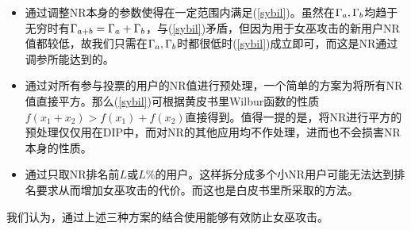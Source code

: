 \begin{itemize}
	\item 通过调整NR本身的参数使得在一定范围内满足(\ref{sybil})。虽然在$\Gamma_a,\Gamma_b$均趋于无穷时有$\Gamma_{a+b}=\Gamma_a+\Gamma_b$，与(\ref{sybil})矛盾，但因为用于女巫攻击的新用户NR值都较低，故我们只需在$\Gamma_a,\Gamma_b$时都很低时(\ref{sybil})成立即可，而这是NR通过调参所能达到的。
	
	\item 通过对所有参与投票的用户的NR值进行预处理，一个简单的方案为将所有NR值直接平方。那么(\ref{sybil})可根据黄皮书\cite{Nabulasyellowpaper}里Wilbur函数的性质$f(x_1+x_2)>f(x_1)+f(x_2)$直接得到。值得一提的是，将NR进行平方的预处理仅仅用在DIP中，而对NR的其他应用均不作处理，进而也不会损害NR本身的性质。
	
	\item 通过只取NR排名前$L$或$L\%$的用户。这样拆分成多个小NR用户可能无法达到排名要求从而增加女巫攻击的代价。而这也是白皮书\cite{Nabulaswhitepaper}里所采取的方法。
\end{itemize}
我们认为，通过上述三种方案的结合使用能够有效防止女巫攻击。